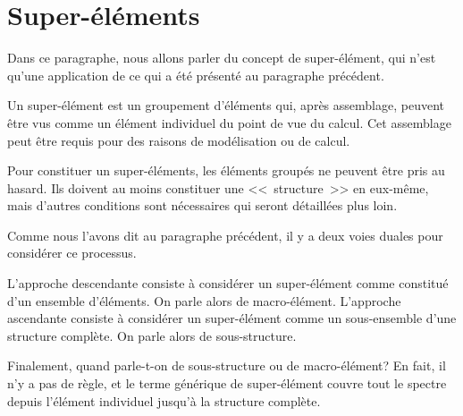 \medskip
\section{Super-éléments}

Dans ce paragraphe, nous allons parler du concept de super-élément, qui n'est qu'une
application de ce qui a été présenté au paragraphe précédent.

\medskip
Un super-élément est un groupement d'éléments qui, après
assemblage, peuvent être vus comme un élément individuel du point de vue du calcul.
Cet assemblage peut être requis pour des raisons de modélisation ou de calcul.

Pour constituer un super-éléments, les éléments groupés ne peuvent être
pris au hasard. Ils doivent au moins constituer une <<~structure~>> en eux-même, mais
d'autres conditions sont nécessaires qui seront détaillées plus loin.

Comme nous l'avons dit au paragraphe précédent, il y a deux voies duales pour considérer
ce processus.

L'approche descendante consiste à considérer un super-élément comme constitué
d'un ensemble d'éléments. On parle alors de macro-élément.
L'approche ascendante consiste à considérer un super-élément comme un sous-ensemble
d'une structure complète. On parle alors de sous-structure.

Finalement, quand parle-t-on de sous-structure ou de macro-élément?
En fait, il n'y a pas de règle, et le terme générique de super-élément couvre tout le
spectre depuis l'élément individuel jusqu'à la structure complète.

